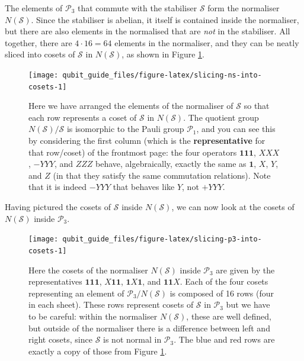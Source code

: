 \documentclass[fleqn,a4paper]{article}
\theoremstyle{definition}
\theoremstyle{definition}
\theoremstyle{definition}
\theoremstyle{definition}
\theoremstyle{remark}
\begin{document}
The elements of \(\mathcal{P}_3\) that commute with the stabiliser \(\mathcal{S}\) form the normaliser \(N(\mathcal{S})\).
Since the stabiliser is abelian, it itself is contained inside the normaliser, but there are also elements in the normalised that are \emph{not} in the stabiliser.
All together, there are \(4\cdot16=64\) elements in the normaliser, and they can be neatly sliced into cosets of \(\mathcal{S}\) in \(N(\mathcal{S})\), as shown in Figure \ref{fig:slicing-ns-into-cosets}.



\begin{figure}[H]

{\centering \texttt{[image: qubit\_guide\_files/figure-latex/slicing-ns-into-cosets-1]} 

}

\caption{Here we have arranged the elements of the normaliser of \(\mathcal{S}\) so that each row represents a coset of \(\mathcal{S}\) in \(N(\mathcal{S})\). The quotient group \(N(\mathcal{S})/\mathcal{S}\) is isomorphic to the Pauli group \(\mathcal{P}_1\), and you can see this by considering the first column (which is the \textbf{representative} for that row/coset) of the frontmost page: the four operators \(\mathbf{1}\mathbf{1}\mathbf{1}\), \(XXX\), \(-YYY\), and \(ZZZ\) behave, algebraically, exactly the same as \(\mathbf{1}\), \(X\), \(Y\), and \(Z\) (in that they satisfy the same commutation relations). Note that it is indeed \(-YYY\) that behaves like \(Y\), not \(+YYY\).}\label{fig:slicing-ns-into-cosets}
\end{figure}

Having pictured the cosets of \(\mathcal{S}\) inside \(N(\mathcal{S})\), we can now look at the cosets of \(N(\mathcal{S})\) inside \(\mathcal{P}_3\).



\begin{figure}[H]

{\centering \texttt{[image: qubit\_guide\_files/figure-latex/slicing-p3-into-cosets-1]} 

}

\caption{Here the cosets of the normaliser \(N(\mathcal{S})\) inside \(\mathcal{P}_3\) are given by the representatives \(\mathbf{1}\mathbf{1}\mathbf{1}\), \(X\mathbf{1}\mathbf{1}\), \(\mathbf{1}X\mathbf{1}\), and \(\mathbf{1}\mathbf{1}X\). Each of the four cosets representing an element of \(\mathcal{P}_3/N(\mathcal{S})\) is composed of 16 rows (four in each sheet). These rows represent cosets of \(\mathcal{S}\) in \(\mathcal{P}_3\) but we have to be careful: within the normaliser \(N(\mathcal{S})\), these are well defined, but outside of the normaliser there is a difference between left and right cosets, since \(\mathcal{S}\) is not normal in \(\mathcal{P}_3\). The blue and red rows are exactly a copy of those from Figure \ref{fig:slicing-ns-into-cosets}.}\label{fig:slicing-p3-into-cosets}
\end{figure}
\end{document}
